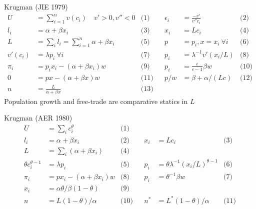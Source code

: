 \documentclass[11pt,notes=hide,aspectratio=169]{beamer}
\begin{document}
\begin{frame}{Krugman (JIE 1979)}
\vspace{-5mm}
\begin{align*}
U &= \sum_{i=1}^{n} v(c_i) \quad v'>0, v''<0
&\text{(1)} &&
\epsilon_i &= \frac{-v'}{v'' c_i}
&\text{(2)} \\
l_i &= \alpha + \beta x_i
&\text{(3)} &&
x_i &= L c_i
&\text{(4)} \\
L &= \sum_i l_i = \sum_{i=1}^{n} \alpha + \beta x_i
&\text{(5)} &&
p &= p_i, x=x_i \ \forall i
&\text{(6)} \\
v'(c_i) &= \lambda p_i \ \forall i
&\text{(7)} &&
p_i &= \lambda^{-1} v'\left(x_i / L\right)
&\text{(8)} \\
\pi_i &= p_i x_i - (\alpha+\beta x_i) w
&\text{(9)} &&
p_i &= \frac{\epsilon}{\epsilon-1}\beta w
&\text{(10)} \\
0 &= px - (\alpha+\beta x)w
&\text{(11)} &&
p/w & = \beta + \alpha/(Lc)
&\text{(12)} \\
n &= \frac{L}{\alpha + \beta x}
&\text{(13)}
\end{align*}
Population growth and free-trade are comparative statics in $L$
\end{frame}
\begin{frame}{Krugman (AER 1980)}
\begin{align*}
U &= \sum_i c_i^{\theta}
&\text{(1)} \\
l_i &= \alpha + \beta x_i
&\text{(2)} &&
x_i &= L c_i
&\text{(3)} \\
L &= \sum_i (\alpha + \beta x_i)
&\text{(4)} \\
\theta c_i ^{\theta-1} &= \lambda p_i
&\text{(5)} &&
p_i &=  \theta \lambda^{-1} (x_i / L)^{\theta-1}
&\text{(6)} \\
\pi_i &= px_i - (\alpha+\beta x_i)w
&\text{(8)} &&
p_i &= \theta^{-1} \beta w
&\text{(7)} \\
x_i &= \alpha \theta / \beta (1-\theta)
&\text{(9)} \\
n &= L(1-\theta)/\alpha
&\text{(10)} &&
n^* &= L^*(1-\theta)/\alpha
&\text{(11)}
\end{align*}
\end{frame}
\end{document}
